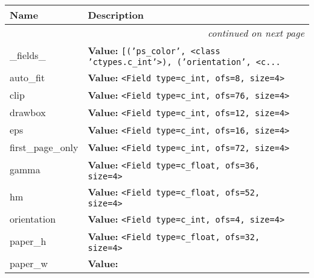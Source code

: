     \vspace{-1cm}
\hspace{\varindent}\begin{longtable}{|p{\varnamewidth}|p{\vardescrwidth}|l}
\cline{1-2}
\cline{1-2} \centering \textbf{Name} & \centering \textbf{Description}& \\
\cline{1-2}
\endhead\cline{1-2}\multicolumn{3}{r}{\small\textit{continued on next page}}\\\endfoot\cline{1-2}
\endlastfoot\raggedright \_\-f\-i\-e\-l\-d\-s\-\_\- & \raggedright \textbf{Value:} 
{\tt \texttt{[}\texttt{(}\texttt{'}\texttt{ps\_color}\texttt{'}\texttt{, }{\textless}class 'ctypes.c\_int'{\textgreater}\texttt{)}\texttt{, }\texttt{(}\texttt{'}\texttt{orientation}\texttt{'}\texttt{, }{\textless}c\texttt{...}}&\\
\cline{1-2}
\raggedright a\-u\-t\-o\-\_\-f\-i\-t\- & \raggedright \textbf{Value:} 
{\tt {\textless}Field type=c\_int, ofs=8, size=4{\textgreater}}&\\
\cline{1-2}
\raggedright c\-l\-i\-p\- & \raggedright \textbf{Value:} 
{\tt {\textless}Field type=c\_int, ofs=76, size=4{\textgreater}}&\\
\cline{1-2}
\raggedright d\-r\-a\-w\-b\-o\-x\- & \raggedright \textbf{Value:} 
{\tt {\textless}Field type=c\_int, ofs=12, size=4{\textgreater}}&\\
\cline{1-2}
\raggedright e\-p\-s\- & \raggedright \textbf{Value:} 
{\tt {\textless}Field type=c\_int, ofs=16, size=4{\textgreater}}&\\
\cline{1-2}
\raggedright f\-i\-r\-s\-t\-\_\-p\-a\-g\-e\-\_\-o\-n\-l\-y\- & \raggedright \textbf{Value:} 
{\tt {\textless}Field type=c\_int, ofs=72, size=4{\textgreater}}&\\
\cline{1-2}
\raggedright g\-a\-m\-m\-a\- & \raggedright \textbf{Value:} 
{\tt {\textless}Field type=c\_float, ofs=36, size=4{\textgreater}}&\\
\cline{1-2}
\raggedright h\-m\- & \raggedright \textbf{Value:} 
{\tt {\textless}Field type=c\_float, ofs=52, size=4{\textgreater}}&\\
\cline{1-2}
\raggedright o\-r\-i\-e\-n\-t\-a\-t\-i\-o\-n\- & \raggedright \textbf{Value:} 
{\tt {\textless}Field type=c\_int, ofs=4, size=4{\textgreater}}&\\
\cline{1-2}
\raggedright p\-a\-p\-e\-r\-\_\-h\- & \raggedright \textbf{Value:} 
{\tt {\textless}Field type=c\_float, ofs=32, size=4{\textgreater}}&\\
\cline{1-2}
\raggedright p\-a\-p\-e\-r\-\_\-w\- & \raggedright \textbf{Value:} 

\end{longtable}
